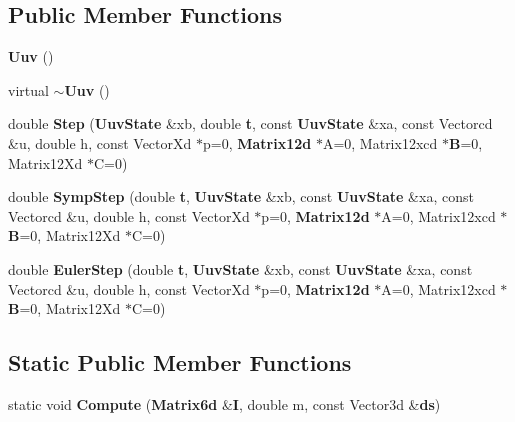 \subsection*{\-Public \-Member \-Functions}
\begin{DoxyCompactItemize}
\item 
{\bf \-Uuv} ()
\item 
virtual {\bf $\sim$\-Uuv} ()
\item 
double {\bf \-Step} ({\bf \-Uuv\-State} \&xb, double {\bf t}, const {\bf \-Uuv\-State} \&xa, const \-Vectorcd \&u, double h, const \-Vector\-Xd $\ast$p=0, {\bf \-Matrix12d} $\ast$\-A=0, \-Matrix12xcd $\ast${\bf \-B}=0, \-Matrix12\-Xd $\ast$\-C=0)
\item 
double {\bf \-Symp\-Step} (double {\bf t}, {\bf \-Uuv\-State} \&xb, const {\bf \-Uuv\-State} \&xa, const \-Vectorcd \&u, double h, const \-Vector\-Xd $\ast$p=0, {\bf \-Matrix12d} $\ast$\-A=0, \-Matrix12xcd $\ast${\bf \-B}=0, \-Matrix12\-Xd $\ast$\-C=0)
\item 
double {\bf \-Euler\-Step} (double {\bf t}, {\bf \-Uuv\-State} \&xb, const {\bf \-Uuv\-State} \&xa, const \-Vectorcd \&u, double h, const \-Vector\-Xd $\ast$p=0, {\bf \-Matrix12d} $\ast$\-A=0, \-Matrix12xcd $\ast${\bf \-B}=0, \-Matrix12\-Xd $\ast$\-C=0)
\end{DoxyCompactItemize}
\subsection*{\-Static \-Public \-Member \-Functions}
\begin{DoxyCompactItemize}
\item 
static void {\bf \-Compute} ({\bf \-Matrix6d} \&{\bf \-I}, double m, const \-Vector3d \&{\bf ds})
\end{DoxyCompactItemize}
